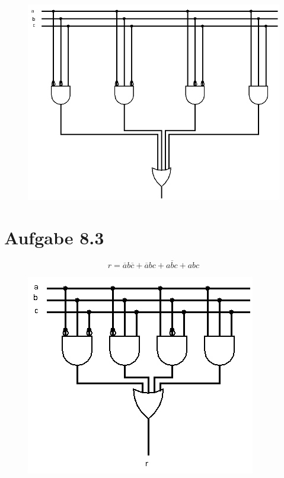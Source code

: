\documentclass[10pt,a4paper]{article}
\begin{document}
\begin{figure}[h]
\includegraphics[scale=0.6]{8_2.png}
\end{figure}

\section*{Aufgabe 8.3}

\begin{equation}
r = \overline{a}b\overline{c} + \overline{a}bc + a\overline{b}c + abc
\end{equation}

\begin{figure}[h]
\includegraphics[scale=0.6]{8_3.png}
\end{figure}
\end{document}
